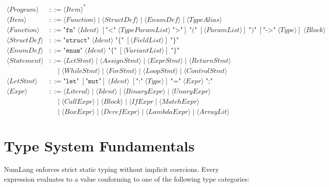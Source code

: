 \begin{align*}
\langle Program \rangle &::= \langle Item \rangle^* \\
\langle Item \rangle &::= \langle Function \rangle \mid \langle StructDef \rangle \mid \langle EnumDef \rangle \mid \langle TypeAlias \rangle \\
\langle Function \rangle &::= \texttt{"fn"}\; \langle Ident \rangle\; [\texttt{"<"}\; \langle TypeParamList \rangle\; \texttt{">"}]\; \texttt{"("}\; [\langle ParamList \rangle]\; \texttt{")"}\; [\texttt{"->"}\; \langle Type \rangle]\; \langle Block \rangle \\
\langle StructDef \rangle &::= \texttt{"struct"}\; \langle Ident \rangle\; \texttt{"\{"}\; [\langle FieldList \rangle]\; \texttt{"\}"} \\
\langle EnumDef \rangle &::= \texttt{"enum"}\; \langle Ident \rangle\; \texttt{"\{"}\; [\langle VariantList \rangle]\; \texttt{"\}"} \\
\langle Statement \rangle &::= \langle LetStmt \rangle \mid \langle AssignStmt \rangle \mid \langle ExprStmt \rangle \mid \langle ReturnStmt \rangle \\
&\quad\mid \langle WhileStmt \rangle \mid \langle ForStmt \rangle \mid \langle LoopStmt \rangle \mid \langle ControlStmt \rangle \\
\langle LetStmt \rangle &::= \texttt{"let"}\; [\texttt{"mut"}]\; \langle Ident \rangle\; [\texttt{":"}\; \langle Type \rangle]\; \texttt{"="}\; \langle Expr \rangle\; \texttt{";"} \\
\langle Expr \rangle &::= \langle Literal \rangle \mid \langle Ident \rangle \mid \langle BinaryExpr \rangle \mid \langle UnaryExpr \rangle \\
&\quad\mid \langle CallExpr \rangle \mid \langle Block \rangle \mid \langle IfExpr \mid \langle MatchExpr \rangle \\
&\quad\mid \langle BoxExpr \rangle \mid \langle DerefExpr \rangle \mid \langle LambdaExpr \rangle \mid \langle ArrayLit \rangle
\end{align*}

\section{Type System Fundamentals}
\label{sec:lang:types}

NumLang enforces strict static typing without implicit coercions. Every expression evaluates to a value conforming to one of the following type categories:

